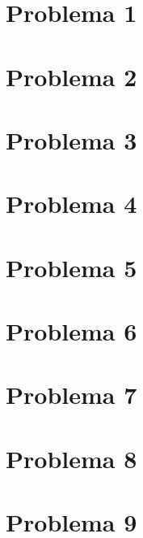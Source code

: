\documentclass{article}
\theoremstyle{theorem-style}  %
\theoremstyle{definition-style}
\theoremstyle{example-style}
\begin{document}
\makeatletter\renewcommand{\ALG@name}{Algoritmo}

\maketitle




\section*{Problema 1}

\newpage
\section*{Problema 2}

\newpage
\section*{Problema 3}

\newpage
\section*{Problema 4}

\newpage
\section*{Problema 5}

\newpage
\section*{Problema 6}

\newpage
\section*{Problema 7}

\newpage
\section*{Problema 8}

\newpage
\section*{Problema 9}
\end{document}
